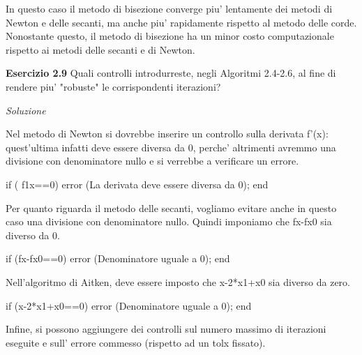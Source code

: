 \documentclass[20pt,a4paper]{book}
\begin{document}
\vspace{2mm}

In questo caso il metodo di bisezione converge piu' lentamente dei metodi di Newton e delle secanti, ma
anche piu' rapidamente rispetto al metodo delle corde.\\
Nonostante questo, il metodo di bisezione ha un minor costo computazionale rispetto ai metodi delle secanti e di Newton.


\vspace{10mm}

\textbf{\Large{Esercizio 2.9}} Quali controlli introdurreste, negli Algoritmi 2.4-2.6, al fine di rendere piu' "robuste" le corrispondenti iterazioni?

\textit{Soluzione}

Nel metodo di Newton si dovrebbe inserire un controllo sulla derivata f'(x): quest'ultima infatti deve essere diversa da 0, perche' altrimenti avremmo una divisione con denominatore nullo e si verrebbe a verificare un errore.

if ( f1x==0) 
error (La derivata deve essere diversa da 0);
end

\vspace{3mm}

Per quanto riguarda il metodo delle secanti, vogliamo evitare anche in questo caso una divisione con denominatore nullo. Quindi imponiamo che fx-fx0 sia diverso da 0.

if (fx-fx0==0) 
error (Denominatore uguale a 0);
end

\vspace{3mm}

Nell'algoritmo di Aitken, deve essere imposto che x-2*x1+x0 sia diverso da zero.

if (x-2*x1+x0==0) 
error (Denominatore uguale a 0);
end

\vspace{3mm}

Infine, si possono aggiungere dei controlli sul numero massimo di iterazioni eseguite e sull' errore commesso (rispetto ad un tolx fissato).


\vspace{10mm}
\end{document}
